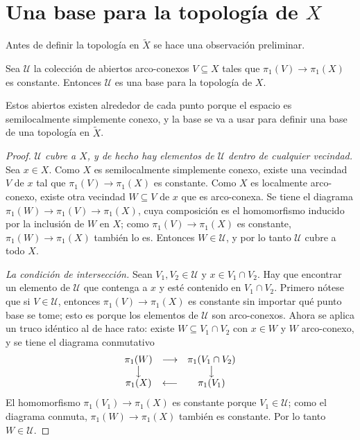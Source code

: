 \documentclass[11pt]{article}
\begin{document}
\section*{Una base para la topología de $X$}

Antes de definir la topología en $\tilde X$ se hace una observación preliminar.

\begin{lema}\label{lema:base-X}
Sea $\mathcal U$ la colección de abiertos arco-conexos $V\subseteq X$ tales que $\pi_1(V)\to\pi_1(X)$ es constante. Entonces $\mathcal U$ es una base para la topología de $X$.
\end{lema}

Estos abiertos existen alrededor de cada punto porque el espacio es semilocalmente simplemente conexo, y la base se va a usar para definir una base de una topología en $\tilde X$.

\begin{proof}
\emph{$\mathcal U$ cubre a $X$, y de hecho hay elementos de $\mathcal U$ dentro de cualquier vecindad.} Sea $x\in X$. Como $X$ es semilocalmente simplemente conexo, existe una vecindad $V$ de $x$ tal que $\pi_1(V)\to\pi_1(X)$ es constante. Como $X$ es localmente arco-conexo, existe otra vecindad $W\subseteq V$ de $x$ que es arco-conexa. Se tiene el diagrama $\pi_1(W)\to\pi_1(V)\to\pi_1(X)$, cuya composición es el homomorfismo inducido por la inclusión de $W$ en $X$; como $\pi_1(V)\to\pi_1(X)$ es constante, $\pi_1(W)\to\pi_1(X)$ también lo es. Entonces $W\in\mathcal U$, y por lo tanto $\mathcal U$ cubre a todo $X$.

\medskip\noindent\emph{La condición de intersección.} Sean $V_1,V_2\in\mathcal U$ y $x\in V_1\cap V_2$. Hay que encontrar un elemento de $\mathcal U$ que contenga a $x$ y esté contenido en $V_1\cap V_2$. Primero nótese que si $V\in\mathcal U$, entonces $\pi_1(V)\to\pi_1(X)$ es constante sin importar qué punto base se tome; esto es porque los elementos de $\mathcal U$ son arco-conexos. Ahora se aplica un truco idéntico al de hace rato: existe $W\subseteq V_1\cap V_2$ con $x\in W$ y $W$ arco-conexo, y se tiene el diagrama conmutativo
\[
  \begin{array}{ccc}
    \pi_1(W) & \longrightarrow & \pi_1(V_1\cap V_2)\\
    \big\downarrow & & \big\downarrow\\
    \pi_1(X) & \longleftarrow & \pi_1(V_1)
  \end{array}
\]
El homomorfismo $\pi_1(V_1)\to\pi_1(X)$ es constante porque $V_1\in\mathcal U$; como el diagrama conmuta, $\pi_1(W)\to\pi_1(X)$ también es constante. Por lo tanto $W\in\mathcal U$.
\end{proof}
\end{document}
